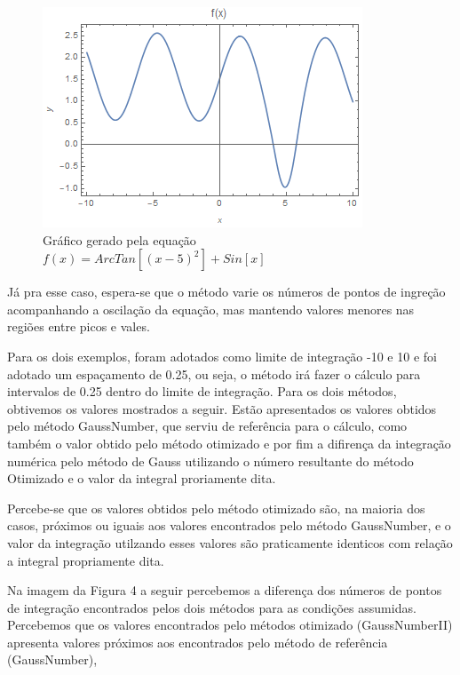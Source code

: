 \documentclass[12pt,a4paper]{article}
\begin{document}
\begin{figure}[h]
\begin{center}
\includegraphics{images/funcao_arctangsin}
\caption{Gráfico gerado pela equação $f(x)=ArcTan[(x-5)^{2}]+Sin[x]$}
\end{center}
\end{figure}

Já pra esse caso, espera-se que o método varie os números de pontos de ingreção acompanhando a oscilação da equação, mas mantendo valores menores nas regiões entre picos e vales. 

Para os dois exemplos, foram adotados como limite de integração -10 e 10 e foi adotado um espaçamento de 0.25, ou seja, o método irá fazer o cálculo para intervalos de 0.25 dentro do limite de integração. Para os dois métodos, obtivemos os valores mostrados a seguir. Estão apresentados os valores obtidos pelo método GaussNumber, que serviu de referência para o cálculo, como também o valor obtido pelo método otimizado e por fim a difirença da integração numérica pelo método de Gauss utilizando o número resultante do método Otimizado e o valor da integral proriamente dita.

Percebe-se que os valores obtidos pelo método otimizado são, na maioria dos casos, próximos ou iguais aos valores encontrados pelo método GaussNumber, e o valor da integração utilzando esses valores são praticamente identicos com relação a integral propriamente dita.

\newpage

\newpage

\quad Na imagem da Figura 4 a seguir percebemos a diferença dos números de pontos de integração encontrados pelos dois métodos para as condições assumidas. Percebemos que os valores encontrados pelo métodos otimizado (GaussNumberII) apresenta valores próximos aos encontrados pelo método de referência (GaussNumber),
\end{document}
